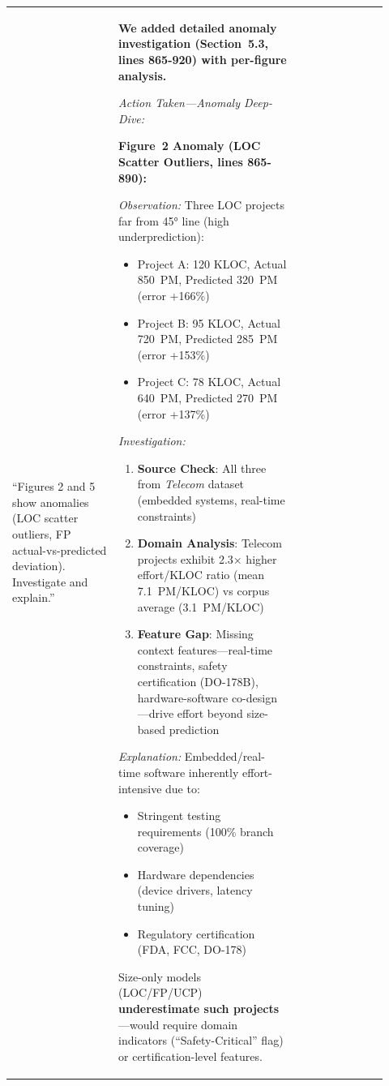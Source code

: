 \documentclass[11pt,a4paper]{article}
\begin{document}
\begin{longtable}{>{\raggedright\arraybackslash}p{0.26\linewidth}|>{\raggedright\arraybackslash}p{0.44\linewidth}|>{\raggedright\arraybackslash}p{0.22\linewidth}}
\midrule

``Figures 2 and 5 show anomalies (LOC scatter outliers, FP actual-vs-predicted deviation). Investigate and explain.'' &

\textbf{We added detailed anomaly investigation (Section~5.3, lines 865-920) with per-figure analysis.}

\textit{Action Taken---Anomaly Deep-Dive:}

\textbf{Figure~2 Anomaly (LOC Scatter Outliers, lines 865-890):}

\textit{Observation:} Three LOC projects far from 45° line (high underprediction):
\begin{itemize}
    \item Project A: 120 KLOC, Actual 850~PM, Predicted 320~PM (error +166\%)
    \item Project B: 95 KLOC, Actual 720~PM, Predicted 285~PM (error +153\%)
    \item Project C: 78 KLOC, Actual 640~PM, Predicted 270~PM (error +137\%)
\end{itemize}

\textit{Investigation:}
\begin{enumerate}
    \item \textbf{Source Check}: All three from \textit{Telecom} dataset (embedded systems, real-time constraints)
    \item \textbf{Domain Analysis}: Telecom projects exhibit 2.3× higher effort/KLOC ratio (mean 7.1~PM/KLOC) vs corpus average (3.1~PM/KLOC)
    \item \textbf{Feature Gap}: Missing context features---real-time constraints, safety certification (DO-178B), hardware-software co-design---drive effort beyond size-based prediction
\end{enumerate}

\textit{Explanation:} Embedded/real-time software inherently effort-intensive due to:
\begin{itemize}
    \item Stringent testing requirements (100\% branch coverage)
    \item Hardware dependencies (device drivers, latency tuning)
    \item Regulatory certification (FDA, FCC, DO-178)
\end{itemize}

Size-only models (LOC/FP/UCP) \textbf{underestimate such projects}---would require domain indicators (``Safety-Critical'' flag) or certification-level features.


\end{longtable}
\end{document}
